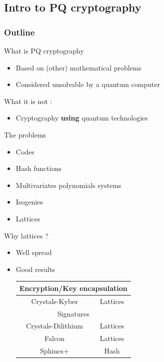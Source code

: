\documentclass{beamer}
\begin{document}
\subsection{Intro to PQ cryptography}
\begin{frame}
  \frametitle{Outline}
\end{frame}

\begin{frame}{What is PQ cryptography}
\begin{linenumbers}
	\begin{itemize}
		\item Based on (other) mathematical problems
		\item Considered unsolvable by a quantum computer
	\end{itemize}

	What it is not :
	\begin{itemize}
		\item Cryptography \textbf{using} quantum technologies
	\end{itemize}
\end{linenumbers}
\end{frame}

\begin{frame}{The problems}
	\begin{itemize}
		\item Codes
		\item Hash functions
		\item Multivariates polynomials systems
		\item Isogenies
		\item { Lattices}
	\end{itemize}
\end{frame}

\begin{frame}{Why lattices ?}
	\begin{itemize}
		\item Well spread
		\item Good results
			\begin{table}[h!]
			\begin{tabular}{|c|c|}
				\hline
				\multicolumn{2}{|c|}{Encryption/Key encapsulation} \\
				\hline
				Crystals-Kyber & Lattices \\
				\hline
				\multicolumn{2}{|c|}{Signatures} \\
				\hline
				Crystals-Dilithium & Lattices \\
				Falcon & Lattices \\
				Sphincs+ & Hash \\
				\hline
			\end{tabular}
			\end{table}
	\end{itemize}
\end{frame}
\end{document}
